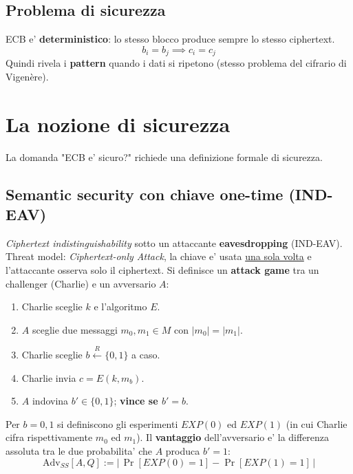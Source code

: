 \subsection{Problema di sicurezza}
ECB e' \textbf{deterministico}: lo stesso blocco produce sempre lo stesso ciphertext.
\[
  b_i = b_j \implies c_i = c_j
\]
Quindi rivela i \textbf{pattern} quando i dati si ripetono (stesso problema del cifrario di Vigenère).

\section{La nozione di sicurezza}
La domanda "ECB e' sicuro?" richiede una definizione formale di sicurezza.

\subsection{Semantic security con chiave one-time (IND-EAV)}
\textit{Ciphertext indistinguishability} sotto un attaccante \textbf{eavesdropping} (IND-EAV). Threat model: \textit{Ciphertext-only Attack}, la chiave e' usata \underline{una sola volta} e l'attaccante osserva solo il ciphertext. Si definisce un \textbf{attack game} tra un challenger (Charlie) e un avversario $ A $:
\begin{enumerate}
  \item Charlie sceglie $ k $ e l'algoritmo $ E $.
  \item $ A $ sceglie due messaggi $ m_0, m_1 \in M $ con $ |m_0| = |m_1| $.
  \item Charlie sceglie $ b \xleftarrow{R} \{0,1\} $ a caso.
  \item Charlie invia $ c = E(k, m_b) $.
  \item $ A $ indovina $ b' \in \{0,1\} $; \textbf{vince se $ b' = b $}.
\end{enumerate}
Per $ b = 0, 1 $ si definiscono gli esperimenti $ EXP(0) $ ed $ EXP(1) $ (in cui Charlie cifra rispettivamente $ m_0 $ ed $ m_1 $). Il \textbf{vantaggio} dell'avversario e' la differenza assoluta tra le due probabilita' che $ A $ produca $ b' = 1 $:
\[
  \mathrm{Adv}_{SS}[A, Q] := \big|\, \Pr[EXP(0) = 1] - \Pr[EXP(1) = 1] \,\big|
\]


